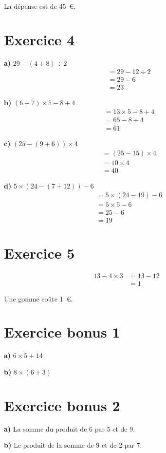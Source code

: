 \documentclass[12pt]{extarticle}
\begin{document}
La dépense est de 45~€.

\section*{Exercice 4}

\textbf{a)} $29 - (4 + 8) \div 2$
\begin{align*}
&= 29 - 12 \div 2 \\
&= 29 - 6 \\
&= 23
\end{align*}

\textbf{b)} $(6 + 7) \times 5 - 8 + 4$
\begin{align*}
&= 13 \times 5 - 8 + 4 \\
&= 65 - 8 + 4 \\
&= 61
\end{align*}

\textbf{c)} $(25 - (9 + 6)) \times 4$
\begin{align*}
&= (25 - 15) \times 4 \\
&= 10 \times 4 \\
&= 40
\end{align*}

\textbf{d)} $5 \times (24 - (7 + 12)) - 6$
\begin{align*}
&= 5 \times (24 - 19) - 6 \\
&= 5 \times 5 - 6 \\
&= 25 - 6 \\
&= 19
\end{align*}

\section*{Exercice 5}
\begin{align*}
13 - 4 \times 3 &= 13 - 12 \\
                &= 1
\end{align*}

Une gomme coûte 1~€.

\section*{Exercice bonus 1}

\textbf{a)} $6 \times 5 + 14$

\textbf{b)} $8 \times (6 + 3)$

\section*{Exercice bonus 2}

\textbf{a)} La somme du produit de 6 par 5 et de 9.

\textbf{b)} Le produit de la somme de 9 et de 2 par 7.
\end{document}
